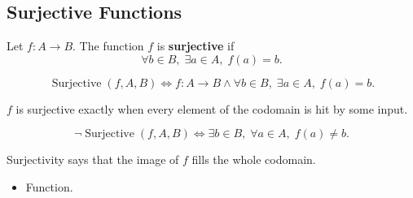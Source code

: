 \subsection{Surjective Functions}
\label{subsec:surjective-functions}

\begin{tcolorbox}[title={Definition --- Surjective}]
\begin{definition}
\label{def:alg-surjective}
Let $f:A\to B$.
The function $f$ is \textbf{surjective} if
\[
\forall b \in B,\; \exists a \in A,\; f(a)=b.
\]
\end{definition}
\end{tcolorbox}

\begin{remark*}
\[
\operatorname{Surjective}(f,A,B)
\Longleftrightarrow
f:A\to B
\land
\forall b\in B,\; \exists a\in A,\; f(a)=b.
\]
\end{remark*}

\begin{remark*}
$f$ is surjective exactly when every element of the codomain is hit by some
input.
\end{remark*}

\begin{remark*}
\[
\neg\operatorname{Surjective}(f,A,B)
\Longleftrightarrow
\exists b\in B,\; \forall a\in A,\; f(a)\neq b.
\]
\end{remark*}

\begin{remark*}[Interpretation]
Surjectivity says that the image of $f$ fills the whole codomain.
\end{remark*}

\begin{remark*}[Dependencies]
\begin{itemize}
  \item Function.
\end{itemize}
\end{remark*}
